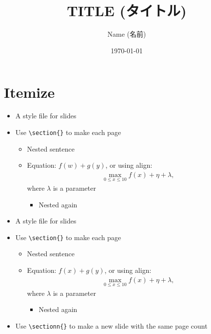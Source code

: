 \documentclass[xelatex,ja=standard,jafont=hiragino-pron,fleqn,no-math,25pt,paper={190.5truemm}{254truemm},english]{bxjsslidemd}
\title{TITLE (タイトル)}
\author{Name (名前)}
\date{\today}
\begin{document}
\maketitle

\section{Itemize}
\begin{itemize}
 \item A style file for slides
 \item Use \verb|\section{}| to make each page
       \begin{itemize}
	\item Nested sentence
	\item Equation: $f(w) + g(y)$, or using align:
	      \begin{align*}
	       \max_{0 \le x \le 10} f(x) + \eta + \lambda,
	      \end{align*}
	      where $\lambda$ is a parameter
	      \begin{itemize}
	       \item Nested again
	      \end{itemize}
       \end{itemize}
 \end{itemize}

\begin{itemize}
 \item A style file for slides
 \item Use \verb|\section{}| to make each page
       \begin{itemize}
	\item Nested sentence
	\item Equation: $f(x) + g(y)$, or using align:
	      \begin{align*}
	       \max_{0 \le x \le 10} f(x) + \eta + \lambda,
	      \end{align*}
	      where $\lambda$ is a parameter
	      \begin{itemize}
	       \item Nested again
	      \end{itemize}
       \end{itemize}
 \item Use \verb|\sectionn{}| to make a new slide with the same page count
\end{itemize}
\end{document}

